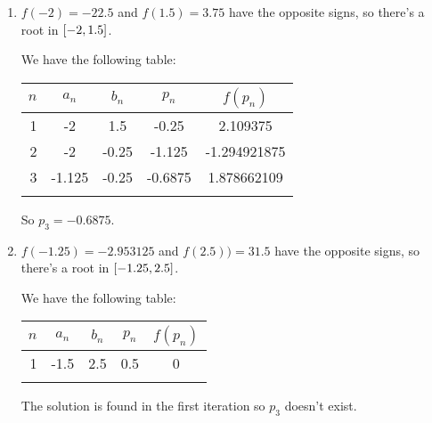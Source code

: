 \documentclass[../../Assignments.tex]{subfiles}
\begin{document}
\begin{solution}
    \begin{enumerate}[label = (\alph*)]
        \item \(f(-2) = \num{-22.5}\) and \(f(\num{1.5}) = \num{3.75}\) have the
            opposite signs, so there's a root in \(\interval{-2}{\num{1.5}}\).

            We have the following table:

            \begin{tabular}{r S[table-format=-1.3] S[table-format=-1.2] S[table-format=-1.4] S[table-format=-1.9]}
                \\
                \toprule
                \(n\)  &  {\(a_n\)}  &  {\(b_n\)}  &  {\(p_n\)}  &  {\(f(p_n)\)}  \\
                  &  -2         &   1.5       &  -0.25      &   2.109375     \\
                    2  &  -2         &  -0.25      &  -1.125     &  -1.294921875  \\
                    3  &  -1.125     &  -0.25      &  -0.6875    &   1.878662109  \\
                \bottomrule
                \\
            \end{tabular}

            So \(p_3 = \num{-0.6875}\).

        \item \(f(\num{-1.25}) = \num{-2.953125}\) and \(f(\num{2.5})) =
            \num{31.5}\) have the opposite signs, so there's a root in
            \(\interval{\num{-1.25}}{\num{2.5}}\).

            We have the following table:

            \begin{tabular}{r S[table-format=-1.1] S[table-format=-1.1] S[table-format=1.1] S[table-format=1.1]}
                \\
                \toprule
                \(n\)  &  {\(a_n\)}  &  {\(b_n\)}  &  {\(p_n\)}  &  {\(f(p_n)\)}  \\
                   &  -1.5       &   2.5       &   0.5       &   0            \\
                \bottomrule
                \\
            \end{tabular}

            The solution is found in the first iteration so \(p_3\) doesn't
            exist.
    \end{enumerate}
\end{solution}
\end{document}
